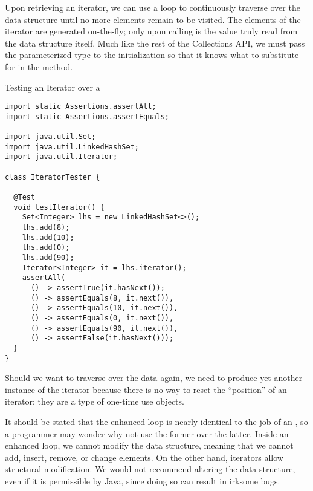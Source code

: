 Upon retrieving an iterator, we can use a  loop to continuously traverse over the data structure until no more elements remain to be visited. The elements of the iterator are generated on-the-fly; only upon calling  is the value truly read from the data structure itself. Much like the rest of the Collections API, we must pass the parameterized type to the  initialization so that it knows what to substitute for  in the  method.


\begin{cl}[]{Testing an Iterator over a }
\begin{lstlisting}[language=MyJava]
import static Assertions.assertAll;
import static Assertions.assertEquals;

import java.util.Set;
import java.util.LinkedHashSet;
import java.util.Iterator;

class IteratorTester {

  @Test
  void testIterator() {
    Set<Integer> lhs = new LinkedHashSet<>();
    lhs.add(8);
    lhs.add(10);
    lhs.add(0);
    lhs.add(90);
    Iterator<Integer> it = lhs.iterator();
    assertAll(
      () -> assertTrue(it.hasNext());
      () -> assertEquals(8, it.next()),
      () -> assertEquals(10, it.next()),
      () -> assertEquals(0, it.next()),
      () -> assertEquals(90, it.next()),
      () -> assertFalse(it.hasNext()));
  }
} 
\end{lstlisting}
\end{cl}

Should we want to traverse over the data again, we need to produce yet another instance of the iterator because there is no way to reset the ``position'' of an iterator; they are a type of one-time use objects.

It should be stated that the enhanced  loop is nearly identical to the job of an , so a programmer may wonder why not use the former over the latter. Inside an enhanced  loop, we cannot modify the data structure, meaning that we cannot add, insert, remove, or change elements. On the other hand, iterators allow structural modification. We would not recommend altering the data structure, even if it is permissible by Java, since doing so can result in irksome bugs. 

